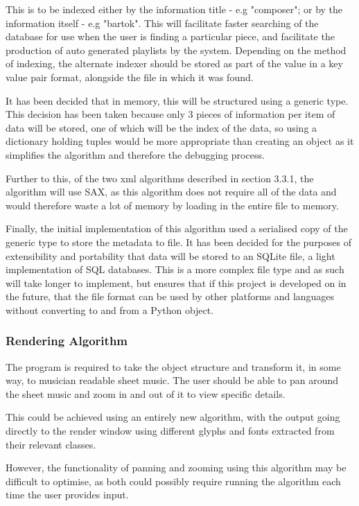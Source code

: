 This is to be indexed either by the information title - e.g "composer"; or by the information itself - e.g "bartok". This will facilitate faster searching of the database for use when the user is finding a particular piece, and facilitate the production of auto generated playlists by the system. Depending on the method of indexing, the alternate indexer should be stored as part of the value in a key value pair format, alongside the file in which it was found.

It has been decided that in memory, this will be structured using a generic type. This decision has been taken because only 3 pieces of information per item of data will be stored, one of which will be the index of the data, so using a dictionary holding tuples would be more appropriate than creating an object as it simplifies the algorithm and therefore the debugging process.

Further to this, of the two xml algorithms described in section 3.3.1, the algorithm will use SAX, as this algorithm does not require all of the data and would therefore waste a lot of memory by loading in the entire file to memory.

Finally, the initial implementation of this algorithm used a serialised copy of the generic type to store the metadata to file. It has been decided for the purposes of extensibility and portability that data will be stored to an SQLite file, a light implementation of SQL databases. This is a more complex file type and as such will take longer to implement, but ensures that if this project is developed on in the future, that the file format can be used by other platforms and languages without converting to and from a Python object.

\subsubsection{Rendering Algorithm}
The program is required to take the object structure and transform it, in some way, to musician readable sheet music. The user should be able to pan around the sheet music and zoom in and out of it to view specific details.

This could be achieved using an entirely new algorithm, with the output going directly to the render window using different glyphs and fonts extracted from their relevant classes.

However, the functionality of panning and zooming using this algorithm may be difficult to optimise, as both could possibly require running the algorithm each time the user provides input. 

